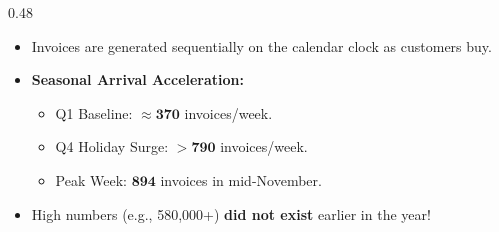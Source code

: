 \documentclass[aspectratio=169,10pt]{beamer}
\begin{document}
\begin{frame}[c]
\begin{columns}[t,onlytextwidth]
\begin{column}{0.48\textwidth}
{\begin{minipage}{\dimexpr\linewidth-2\fboxsep-2\fboxrule\relax}
          {\scriptsize
          \begin{itemize}
            \setlength{\itemsep}{0.08cm}
            \item Invoices are generated sequentially on the calendar clock as customers buy.
            \item \textbf{Seasonal Arrival Acceleration:}
            \begin{itemize}
              \setlength{\itemsep}{0.04cm}
              \item Q1 Baseline: $\approx \mathbf{370}$ invoices/week.
              \item Q4 Holiday Surge: $>\mathbf{790}$ invoices/week.
              \item Peak Week: $\mathbf{894}$ invoices in mid-November.
            \end{itemize}
            \item High numbers (e.g., 580,000+) \textbf{did not exist} earlier in the year!
          \end{itemize}}
          \vspace{0.08cm}
        \end{minipage}
      }
    \end{column}
  \end{columns}
  
  \vspace{0.22cm}
  \begin{center}
    \setlength{\fboxrule}{1pt}
  \end{center}
\end{frame}
\end{document}
